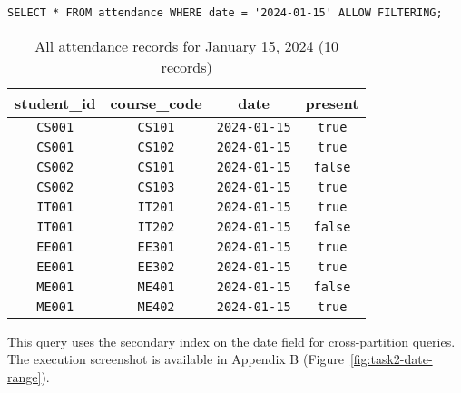 \begin{verbatim}
SELECT * FROM attendance WHERE date = '2024-01-15' ALLOW FILTERING;
\end{verbatim}

\begin{table}[H]
  \centering
  \footnotesize
  \begin{tabular}{|c|c|c|c|}
    \hline
    \textbf{student\_id} & \textbf{course\_code} & \textbf{date} & \textbf{present} \\
    \hline
    \texttt{CS001}                & \texttt{CS101}                 & \texttt{2024-01-15}    & \texttt{true}             \\
    \texttt{CS001}                & \texttt{CS102}                 & \texttt{2024-01-15}    & \texttt{true}             \\
    \texttt{CS002}                & \texttt{CS101}                 & \texttt{2024-01-15}    & \texttt{false}            \\
    \texttt{CS002}                & \texttt{CS103}                 & \texttt{2024-01-15}    & \texttt{true}             \\
    \texttt{IT001}                & \texttt{IT201}                 & \texttt{2024-01-15}    & \texttt{true}             \\
    \texttt{IT001}                & \texttt{IT202}                 & \texttt{2024-01-15}    & \texttt{false}            \\
    \texttt{EE001}                & \texttt{EE301}                 & \texttt{2024-01-15}    & \texttt{true}             \\
    \texttt{EE001}                & \texttt{EE302}                 & \texttt{2024-01-15}    & \texttt{true}             \\
    \texttt{ME001}                & \texttt{ME401}                 & \texttt{2024-01-15}    & \texttt{false}            \\
    \texttt{ME001}                & \texttt{ME402}                 & \texttt{2024-01-15}    & \texttt{true}             \\
    \hline
  \end{tabular}
  \caption{All attendance records for January 15, 2024 (10 records)}
\end{table}

This query uses the secondary index on the date field for cross-partition queries. The execution screenshot is available in Appendix B (Figure~\ref{fig:task2-date-range}).

